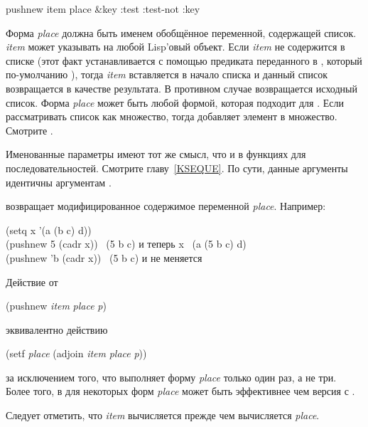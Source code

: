 \begin{defmac}
pushnew item place &key :test :test-not :key

Форма \emph{place} должна быть именем обобщённое переменной, содержащей
список. \emph{item} может указывать на любой Lisp'овый объект. Если \emph{item}
не содержится в списке (этот факт устанавливается с помощью предиката
переданного в , который по-умолчанию ), тогда \emph{item}
вставляется в начало списка и данный список возвращается в качестве результата.
В противном случае возвращается исходный список. Форма \emph{place} может
быть любой формой, которая подходит для .
Если рассматривать список как множество, тогда  добавляет элемент в
множество. Смотрите .

Именованные параметры  имеют тот же смысл, что и в функциях для
последовательностей. Смотрите главу~\ref{KSEQUE}.
По сути, данные аргументы идентичны аргументам .

 возвращает модифицированное содержимое переменной \emph{place}.
Например:
\begin{lisp}
(setq x '(a (b c) d)) \\
(pushnew 5 (cadr x)) \EV\ (5 b c)   \textrm{и теперь} x \EV\ (a (5 b c) d) \\
(pushnew 'b (cadr x)) \EV\ (5 b c)  \textrm{и  не меняется}
\end{lisp}
Действие от
\begin{lisp}
(pushnew \emph{item} \emph{place}  \emph{p})
\end{lisp}
эквивалентно действию
\begin{lisp}
(setf \emph{place} (adjoin \emph{item} \emph{place}  \emph{p}))
\end{lisp}
за исключением того, что  выполняет форму \emph{place} только один раз,
а не три.
Более того, в для некоторых форм \emph{place}  может быть
эффективнее чем версия с .

Следует отметить, что \emph{item} вычисляется прежде чем вычисляется
\emph{place}.
\end{defmac}

